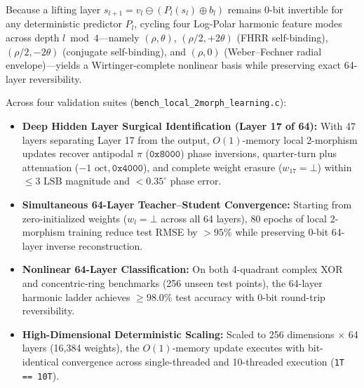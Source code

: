 \documentclass[11pt, a4paper]{article}
\begin{document}
Because a lifting layer $s_{l+1} = v_l \ominus (P_l(s_l) \oplus b_l)$ remains 0-bit invertible for any deterministic predictor $P_l$, cycling four Log-Polar harmonic feature modes across depth $l \bmod 4$---namely $(\rho, \theta)$, $(\rho/2, +2\theta)$ (FHRR self-binding), $(\rho/2, -2\theta)$ (conjugate self-binding), and $(\rho, 0)$ (Weber--Fechner radial envelope)---yields a Wirtinger-complete nonlinear basis while preserving exact 64-layer reversibility.

Across four validation suites (\texttt{bench\_local\_2morph\_learning.c}):
\begin{itemize}
    \item \textbf{Deep Hidden Layer Surgical Identification (Layer 17 of 64):} With 47 layers separating Layer 17 from the output, $O(1)$-memory local 2-morphism updates recover antipodal $\pi$ ($\texttt{0x8000}$) phase inversions, quarter-turn plus attenuation ($-1\text{ oct}, \texttt{0x4000}$), and complete weight erasure ($w_{17} = \bot$) within $\le 3\text{ LSB}$ magnitude and $< 0.35^\circ$ phase error.
    \item \textbf{Simultaneous 64-Layer Teacher--Student Convergence:} Starting from zero-initialized weights ($w_l = \bot$ across all 64 layers), 80 epochs of local 2-morphism training reduce test RMSE by $> 95\%$ while preserving 0-bit 64-layer inverse reconstruction.
    \item \textbf{Nonlinear 64-Layer Classification:} On both 4-quadrant complex XOR and concentric-ring benchmarks (256 unseen test points), the 64-layer harmonic ladder achieves $\ge 98.0\%$ test accuracy with 0-bit round-trip reversibility.
    \item \textbf{High-Dimensional Deterministic Scaling:} Scaled to 256 dimensions $\times$ 64 layers (16,384 weights), the $O(1)$-memory update executes with bit-identical convergence across single-threaded and 10-threaded execution (\texttt{1T == 10T}).
\end{itemize}
\end{document}
